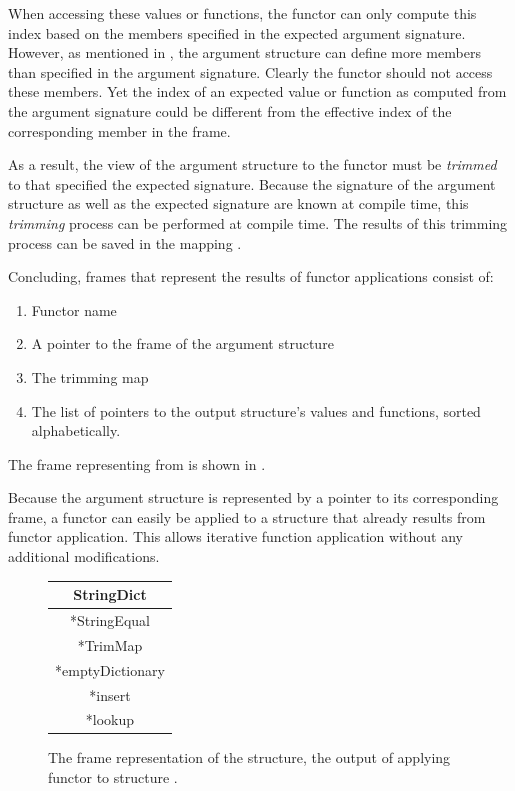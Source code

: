 When accessing these values or functions, the functor can only compute this index based on the members specified in the expected argument signature.
However, as mentioned in , the argument structure can define more members than specified in the argument signature.
Clearly the functor should not access these members.
Yet the index of an expected value or function as computed from the argument signature could be different from the effective index of the corresponding member in the frame.

As a result, the view of the argument structure to the functor must be \emph{trimmed} to that specified the expected signature. 
Because the signature of the argument structure as well as the expected signature are known at compile time, this \emph{trimming} process can be performed at compile time.
The results of this trimming process can be saved in the mapping .

Concluding, frames that represent the results of functor applications consist of:
\begin{enumerate}
\item Functor name
\item A pointer to the frame of the argument structure
\item The trimming map
\item The list of pointers to the output structure's values and functions, sorted alphabetically.
\end{enumerate}
The frame representing  from  is shown in .

Because the argument structure is represented by a pointer to its corresponding frame, a functor can easily be applied to a structure that already results from functor application.
This allows iterative function application without any additional modifications.

\begin{figure}[htb]
\centering
\begin{tabular}{|c|}
\hline
StringDict \\
\hline
*StringEqual\\
*TrimMap\\
\hline
*emptyDictionary \\
*insert \\ 
*lookup \\
\hline
\end{tabular}
\caption[Frame Representation Example:StringDict]{The frame representation of the  structure, the output of applying functor  to structure .\label{fig:StringDictFrame}}
\end{figure}

